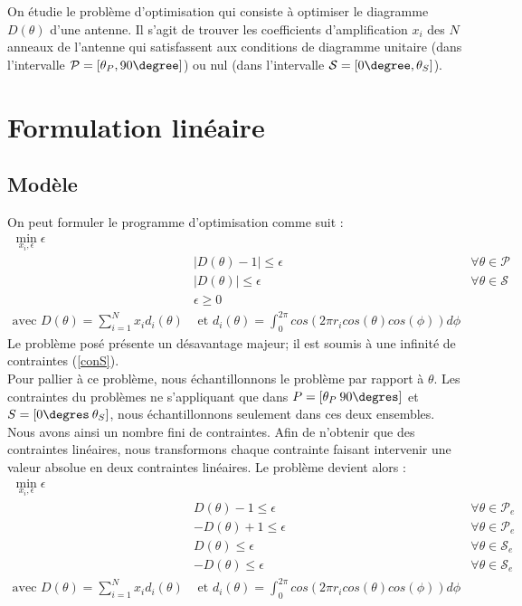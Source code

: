 On étudie le problème d'optimisation qui consiste à optimiser le diagramme $D(\theta)$ d'une antenne. Il s'agit de trouver les coefficients d'amplification $x_i$ des $N$ anneaux de l'antenne qui satisfassent aux conditions de diagramme unitaire (dans l'intervalle $\mathcal{P}=[\theta_P, 90\degree]$) ou nul (dans l'intervalle $\mathcal{S}=[0 \degree,\theta_S]$).

\section{Formulation linéaire}
\subsection{Modèle}
On peut formuler le programme d'optimisation comme suit :
\begin{align}
\min_{x_i,\epsilon} \epsilon & \\
&|D(\theta)-1|  \leq \epsilon &\forall \theta\in \mathcal{P}\\
&|D(\theta)| \leq \epsilon & \forall \theta\in \mathcal{S}\label{conS}\\
& \epsilon \geq 0\\
\text{avec } D(\theta) = \sum_{i=1}^N x_i d_i(\theta) & \text{ et } d_i(\theta) = \int_0^{2 \pi} cos(2 \pi r_i cos(\theta)cos(\phi)) d\phi \label{eq:di}
\end{align}
Le problème posé présente un désavantage majeur; il est soumis à une infinité de contraintes (\ref{conS}).\\
Pour pallier à ce problème, nous échantillonnons le problème par rapport à $\theta$. Les contraintes du problèmes ne s'appliquant que dans $P = [\theta_P\: 90\degres  ]$ et $S = [0\degres \:\theta_S]$, nous échantillonnons seulement dans ces deux ensembles. Nous avons ainsi un nombre fini de contraintes. Afin de n'obtenir que des contraintes linéaires, nous transformons chaque contrainte faisant intervenir une valeur absolue en deux contraintes linéaires. Le problème devient alors : 
\begin{align}
\min_{x_i,\epsilon} \epsilon & & \nonumber\\
& D(\theta)-1\leq \epsilon & \forall \theta\in \mathcal{P}_e \\
& -D(\theta)+1\leq \epsilon & \forall \theta\in \mathcal{P}_e\\
& D(\theta)\leq \epsilon & \forall \theta\in \mathcal{S}_e\\
& -D(\theta)\leq \epsilon &\forall \theta\in \mathcal{S}_e\\
\text{avec } D(\theta) = \sum_{i=1}^N x_i d_i(\theta) & \text{ et } d_i(\theta) = \int_0^{2 \pi} cos(2 \pi r_i cos(\theta)cos(\phi)) d\phi 
\end{align}
